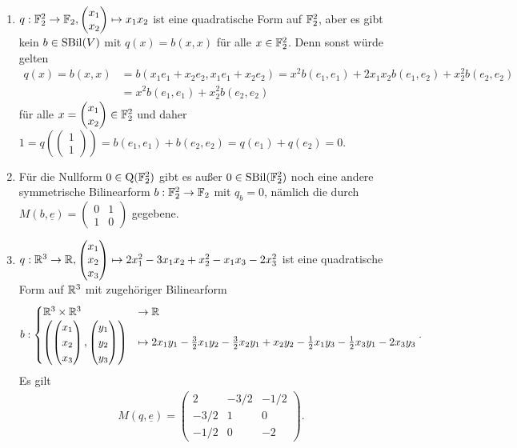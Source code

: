 \documentclass[../../main.tex]{subfiles}
\begin{document}
\begin{bsp}
\begin{enumerate}[\normalfont(a)]
\item $q: \mathbb F_2^2\to \mathbb F_2, \begin{pmatrix}x_1\\x_2\end{pmatrix}\mapsto x_1x_2$ ist eine quadratische Form auf $\mathbb F_2^2$, aber es gibt kein $b\in \operatorname{SBil}(V)$ mit $q(x)=b(x,x)$ für alle $x\in \mathbb F_2^2$. Denn sonst würde gelten
\begin{align*}	q(x)=b(x,x)&=b(x_1e_1+x_2e_2,x_1e_1+x_2e_2)=x^2b(e_1,e_1)+2x_1x_2b(e_1,e_2)+x_2^2b(e_2,e_2)\\
&=x^2b(e_1,e_1)+x_2^2b(e_2,e_2)
\end{align*}
für alle $x=\begin{pmatrix}x_1\\x_2\end{pmatrix}\in \mathbb F_2^2$ und daher $1=q\left(\begin{pmatrix}1\\1\end{pmatrix}\right)=b(e_1,e_1)+b(e_2,e_2)=q(e_1)+q(e_2)=0$.
\item Für die Nullform  $0\in \operatorname{Q}(\mathbb F_2^2)$ gibt es außer $0\in \operatorname{SBil}(\mathbb F_2^2)$ noch eine andere symmetrische Bilinearform $b: \mathbb F_2^2\to \mathbb F_2$ mit $q_b=0$, nämlich die durch $M(b,\underline{e})=\begin{pmatrix}0 & 1\\ 1&0\end{pmatrix}$ gegebene.
\item $q: \mathbb R^3\to \mathbb R, \begin{pmatrix}x_1\\ x_2\\x_3\end{pmatrix}\mapsto 2x_1^2-3x_1x_2+x_2^2-x_1x_3-2x_3^2$ ist eine quadratische Form auf $\mathbb R^3$ mit zugehöriger Bilinearform
\begin{align*}
b: \begin{cases}\mathbb R^3\times \mathbb R^3&\to \mathbb R\\ \left(\begin{pmatrix}x_1\\ x_2\\x_3\end{pmatrix}, \begin{pmatrix}y_1\\ y_2\\y_3\end{pmatrix}\right)&\mapsto 2x_1y_1-\frac{3}{2}x_1y_2-\frac{3}{2}x_2y_1+x_2y_2-\frac{1}{2}x_1y_3-\frac{1}{2}x_3y_1-2x_3y_3\end{cases}.
\end{align*}
Es gilt
\begin{align*}
M(q,\underline{e})=\begin{pmatrix*} 2 & -3/2 & -1/2\\-3/2 &1 & 0\\ -1/2 & 0 & -2\end{pmatrix*}.
\end{align*}
\end{enumerate}
\end{bsp}
\end{document}
